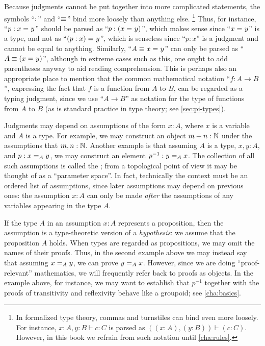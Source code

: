 Because judgments cannot be put together into more complicated statements, the symbols ``$:$'' and ``$\jdeq$'' bind more loosely than anything else.%
\footnote{In formalized type theory, commas and turnstiles can bind even more loosely.
  For instance, $x:A,y:B\vdash c:C$ is parsed as $((x:A),(y:B))\vdash (c:C)$.
  However, in this book we refrain from such notation until \autoref{cha:rules}.}
Thus, for instance, ``$p:\id{x}{y}$'' should be parsed as ``$p:(\id{x}{y})$'', which makes sense since ``$\id{x}{y}$'' is a type, and not as ``$\id{(p:x)}{y}$'', which is senseless since ``$p:x$'' is a judgment and cannot be equal to anything.
Similarly, ``$A\jdeq \id{x}{y}$'' can only be parsed as ``$A\jdeq(\id{x}{y})$'', although in extreme cases such as this, one ought to add parentheses anyway to aid reading comprehension.
This is perhaps also an appropriate place to mention that the common mathematical notation ``$f:A\to B$'', expressing the fact that $f$ is a function from $A$ to $B$, can be regarded as a typing judgment, since we use ``$A\to B$'' as notation for the type of functions from $A$ to $B$ (as is standard practice in type theory; see \autoref{sec:pi-types}).

Judgments may depend on assumptions of the form $x:A$, where $x$ is a variable
%
and $A$ is a type.
For example, we may construct an object $m + n : \nat$ under the assumptions that $m,n : \nat$.
Another example is that assuming $A$ is a type, $x,y : A$, and $p : \id[A]{x}{y}$, we may construct an element $p^{-1} : \id[A]{y}{x}$.
The collection of all such assumptions is called the ;%
from a topological point of view it may be thought of as a ``parameter space''.
In fact, technically the context must be an ordered list of assumptions, since later assumptions may depend on previous ones: the assumption $x:A$ can only be made \emph{after} the assumptions of any variables appearing in the type $A$.

If the type $A$ in an assumption $x:A$ represents a proposition, then the assumption is a type-theoretic version of a \emph{hypothesis}:
%
we assume that the proposition $A$ holds.
When types are regarded as propositions, we may omit the names of their proofs.
Thus, in the second example above we may instead say that assuming $\id[A]{x}{y}$, we can prove $\id[A]{y}{x}$.
However, since we are doing ``proof-relevant'' mathematics,
%
we will frequently refer back to proofs as objects.
In the example above, for instance, we may want to establish that $p^{-1}$ together with the proofs of transitivity and reflexivity behave like a groupoid; see \autoref{cha:basics}.

